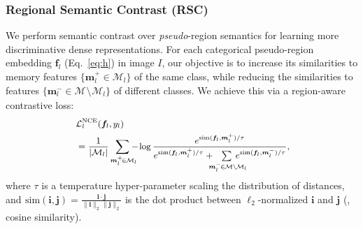\documentclass[10pt,twocolumn,letterpaper]{article}
\begin{document}
 


\subsubsection{Regional Semantic Contrast (RSC)} \label{sec:rsc}

We perform semantic contrast over \textit{pseudo}-region semantics for learning more discriminative dense representations. For each categorical pseudo-region embedding $\bm{f}_l$ (Eq.\!~\ref{eq:h}) in image ${I}$, our objective is to increase its similarities to memory features  $\{ \bm{m}_l^+\!\in\!\mathcal{M}_l \}$ of the same class, while reducing the similarities to features  $\{ \bm{m}_l^-\!\in\!\mathcal{M}_{\!}\setminus_{\!}\mathcal{M}_l \}$ of different classes. We achieve this via a region-aware contrastive loss:
\vspace{-3pt}
\begin{equation}\small\label{eq:pNCE}
	\begin{aligned}
	& \mathcal{L}^{\text{NCE}}_{l} (\bm{f}_l, y_l) \\
	& =\frac{1}{|\mathcal{M}_{l}|}\sum_{\bm{m}_{l}^{+\!}\in_{\!}\mathcal{M}_l\!\!} \!\!\!-_{\!}\log\frac{e^{\text{sim}(\bm{f}_{l}, \bm{m}_{l}^{+})/\tau}}{e^{\text{sim}(\bm{f}_{l}, \bm{m}_{l}^{+})/\tau}
		+ \!\!\!\!\sum\limits_{\bm{m}_{l}^{-\!}\in_{\!}\mathcal{M}\setminus_{\!}\mathcal{M}_l\!\!}\!\!\!\!\!\!\!e^{\text{sim}(\bm{f}_{l}, \bm{m}_{l}^{-})/\tau}},\!\!
	\end{aligned}
	\vspace{-3pt}
\end{equation}
where $\tau$ is a temperature hyper-parameter scaling the distribution of distances,$_{\!}$ and$_{\!}$ $\text{sim}(\bm{i}, \bm{j})\!\!=\!\!\frac{\bm{i}\cdot \bm{j}}{\| \bm{i} \|_{2\!}  \| \bm{j} \|_{2\!}}$ is$_{\!}$ the dot product between $\ell_2$-normalized $\bm{i}$ and $\bm{j}$ (\ie, cosine similarity).
\end{document}
